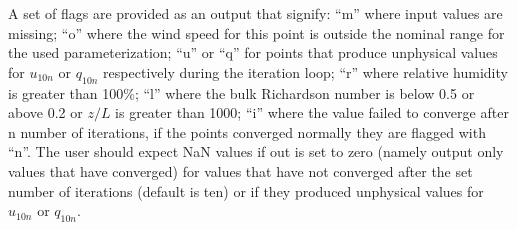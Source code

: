 \documentclass[letterpaper,10pt,english]{sphinxmanual}
\begin{document}
A set of flags are provided as an output that signify: “m” where input values are missing; “o” where the wind speed for this point is outside the nominal range for the used parameterization; “u” or “q” for points that produce unphysical values for \(u_{10n}\)  or \(q_{10n}\) respectively during the iteration loop; “r” where relative humidity is greater than 100\%; “l” where the bulk Richardson number is below \sphinxhyphen{}0.5 or above 0.2 or \(z/L\) is greater than 1000; “i” where the value failed to converge after n number of iterations, if the points converged normally they are flagged with “n”. The user should expect NaN values if out is set to zero (namely output only values that have converged) for values that have not converged after the set number of iterations (default is ten) or if they produced unphysical values for \(u_{10n}\)  or \(q_{10n}\).
\end{document}
